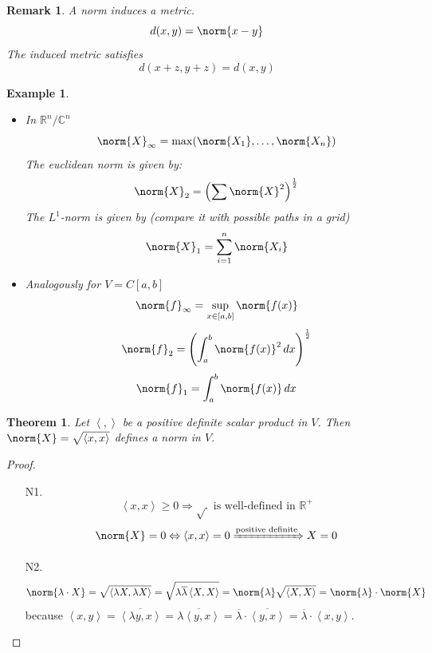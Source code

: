 \documentclass[a4paper,landscape,twocolumn]{article}
\newcommand\functional[1]{\left\langle{#1}\right\rangle}
\newtheorem{theorem}{Theorem}
\newtheorem{ex}{Example}
\newtheorem{rem}{Remark}
\DeclarePairedDelimiter\norm\lVert\rVert
\begin{document}
\begin{rem}
  \label{rem-8.17}
  A norm induces a metric.
  \[ d(x,y) = \norm{x - y} \]
  The induced metric satisfies
  \[ d(x+z, y+z) = d(x,y) \]
\end{rem}

\begin{ex}
  \label{example-8.18}
  \begin{itemize}
    \item
      In $\mathbb R^n/\mathbb C^n$
      \[ \norm{X}_{\infty} = \max(\norm{X_1}, \ldots, \norm{X_n}) \]
      The \emph{euclidean norm} is given by:
      \[ \norm{X}_2 = \left(\sum \norm{X}^2\right)^{\frac 12} \]
      The $L^1$-norm is given by (compare it with possible paths in a grid)
      \[ \norm{X}_1 = \sum_{i=1}^n \norm{X_i} \]
    \item
      Analogously for $V = C[a,b]$
        \[ \norm{f}_{\infty} = \sup_{x \in [a,b]} \norm{f(x)} \]
        \[ \norm{f}_2 = \left(\int_a^b \norm{f(x)}^2 \, dx\right)^{\frac 12} \]
        \[ \norm{f}_1 = \int_a^b \norm{f(x)} \, dx \]
  \end{itemize}
\end{ex}

\begin{theorem}
  \label{satz-8.19}
  Let $\functional{,}$ be a positive definite scalar product in $V$.
  Then $\norm{X} = \sqrt{\functional{x,x}}$ defines a norm in $V$.
\end{theorem}
\begin{proof}
  \begin{enumerate}
    \item[N1.]
      \[ \functional{x,x} \geq 0 \Rightarrow \sqrt{\,} \text{ is  well-defined in } \mathbb R^+ \]
      \[ \norm{X} = 0 \Leftrightarrow \functional{x,x} = 0 \xRightarrow{\text{positive definite}} X = 0  \]
    \item[N2.]
      \[
        \norm{\lambda \cdot X} = \sqrt{\functional{\lambda X, \lambda X}}
        = \sqrt{\lambda \overline{\lambda} \functional{X,X}}
        = \norm{\lambda} \sqrt{\functional{X,X}}
        = \norm{\lambda} \cdot \norm{X}
      \]
      because $\functional{x,y} = \overline{\functional{\lambda y, x}} = \overline{\lambda \functional{y,x}} = \overline{\lambda} \cdot \overline{\functional{y,x}} = \overline{\lambda} \cdot \functional{x,y}$.
  \end{enumerate}
\end{proof}
\end{document}
